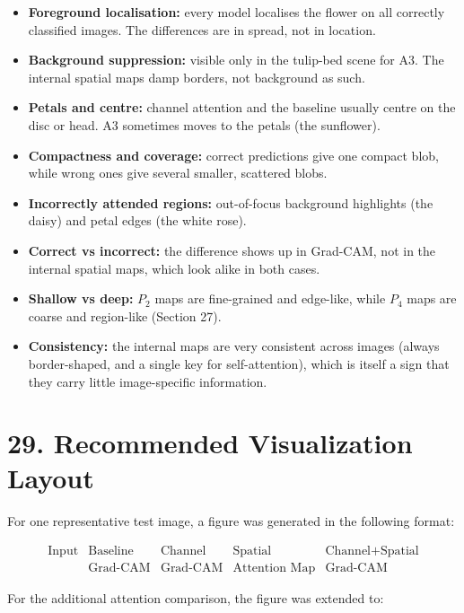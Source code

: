 \documentclass[10pt]{article}
\begin{document}
\begin{itemize}
\item \textbf{Foreground localisation:} every model localises the flower on all
correctly classified images. The differences are in spread, not in location.
\item \textbf{Background suppression:} visible only in the tulip-bed scene for
A3. The internal spatial maps damp borders, not background as such.
\item \textbf{Petals and centre:} channel attention and the baseline usually
centre on the disc or head. A3 sometimes moves to the petals (the sunflower).
\item \textbf{Compactness and coverage:} correct predictions give one compact
blob, while wrong ones give several smaller, scattered blobs.
\item \textbf{Incorrectly attended regions:} out-of-focus background highlights
(the daisy) and petal edges (the white rose).
\item \textbf{Correct vs incorrect:} the difference shows up in Grad-CAM, not in
the internal spatial maps, which look alike in both cases.
\item \textbf{Shallow vs deep:} $P_2$ maps are fine-grained and edge-like, while
$P_4$ maps are coarse and region-like (Section 27).
\item \textbf{Consistency:} the internal maps are very consistent across images
(always border-shaped, and a single key for self-attention), which is itself a
sign that they carry little image-specific information.
\end{itemize}

\section*{29. Recommended Visualization Layout}

For one representative test image, a figure was generated in the following format:

\[
\boxed{
\begin{array}{ccccc}
\text{Input}
&
\text{Baseline}
&
\text{Channel}
&
\text{Spatial}
&
\text{Channel+Spatial}
\\
&
\text{Grad-CAM}
&
\text{Grad-CAM}
&
\text{Attention Map}
&
\text{Grad-CAM}
\end{array}
}
\]

For the additional attention comparison, the figure was extended to:
\end{document}

